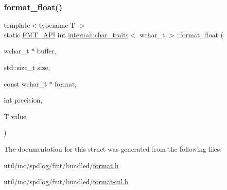\subsubsection{\texorpdfstring{format\+\_\+float()}{format\_float()}\hspace{0.1cm}{\footnotesize\ttfamily [2/2]}}
{\footnotesize\ttfamily template$<$typename T $>$ \\
static \hyperlink{core_8h_a9a4960b70582ed2620911a0b75dce0b5}{F\+M\+T\+\_\+\+A\+PI} int \hyperlink{structinternal_1_1char__traits}{internal\+::char\+\_\+traits}$<$ wchar\+\_\+t $>$\+::format\+\_\+float (\begin{DoxyParamCaption}\item[{wchar\+\_\+t $\ast$}]{buffer,  }\item[{std\+::size\+\_\+t}]{size,  }\item[{const wchar\+\_\+t $\ast$}]{format,  }\item[{int}]{precision,  }\item[{T}]{value }\end{DoxyParamCaption})\hspace{0.3cm}{\ttfamily [static]}}



The documentation for this struct was generated from the following files\+:\begin{DoxyCompactItemize}
\item 
util/inc/spdlog/fmt/bundled/\hyperlink{format_8h}{format.\+h}\item 
util/inc/spdlog/fmt/bundled/\hyperlink{format-inl_8h}{format-\/inl.\+h}\end{DoxyCompactItemize}
